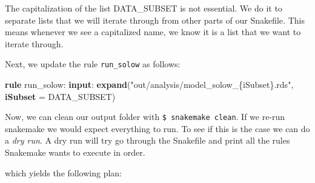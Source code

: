 \documentclass[]{book}
\newenvironment{Shaded}{\begin{snugshade}}{\end{snugshade}}
\newcommand{\KeywordTok}[1]{\textcolor[rgb]{0.13,0.29,0.53}{\textbf{{#1}}}}
\newcommand{\StringTok}[1]{\textcolor[rgb]{0.31,0.60,0.02}{{#1}}}
\newcommand{\NormalTok}[1]{{#1}}
\theoremstyle{definition}
\theoremstyle{definition}
\theoremstyle{definition}
\theoremstyle{remark}
\begin{document}
The capitalization of the list DATA\_SUBSET is not essential. We do it
to separate lists that we will iterate through from other parts of our
Snakefile. This means whenever we see a capitalized name, we know it is
a list that we want to iterate through.

Next, we update the rule \texttt{run\_solow} as follows:

\begin{Shaded}
\begin{Highlighting}[]
\KeywordTok{rule} \NormalTok{run_solow:}
    \KeywordTok{input}\NormalTok{:}
        \KeywordTok{expand}\NormalTok{(}\StringTok{"out/analysis/model_solow_\{iSubset\}.rds"}\NormalTok{,}
                    \KeywordTok{iSubset} \NormalTok{= DATA_SUBSET)}
\end{Highlighting}
\end{Shaded}

Now, we can clean our output folder with \texttt{\$\ snakemake\ clean}.
If we re-run snakemake we would expect everything to run. To see if this
is the case we can do a \emph{dry run}. A dry run will try go through
the Snakefile and print all the rules Snakemake wants to execute in
order.

\begin{Shaded}
\end{Shaded}

which yields the following plan:
\end{document}

